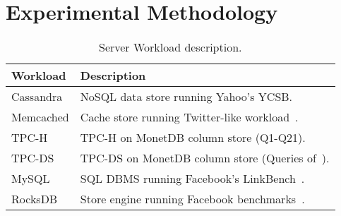 \section{Experimental Methodology}
\label{sec:methodology}

\begin{table}
        \begin{center}
                \caption{Server Workload description.}
                \scalebox{0.7}
                \small
                \vspace{0.01in}
                \label{table:workload}
                \renewcommand{\arraystretch}{1.0}
                {\scriptsize
                        \begin{tabular}{ l  l }
                                \toprule
                                {\bf Workload}                  & {\bf Description}  \\
                                \toprule
                                \multirow{1}{*}{Cassandra}      &  NoSQL data store running Yahoo's YCSB. \\
                                \cmidrule{2-2}
                                \multirow{1}{*}{Memcached}      & Cache store running Twitter-like workload~\cite{lim:thin}. \\
                                \cmidrule{2-2}
                                \multirow{1}{*}{TPC-H}          & TPC-H on MonetDB column store (Q1-Q21). \\
                                \cmidrule{2-2}
                                \multirow{1}{*}{TPC-DS}         & TPC-DS on MonetDB column store (Queries of~\cite{kocberber:meet}). \\
                                \cmidrule{2-2}
                                \multirow{1}{*}{MySQL}          & SQL DBMS running Facebook's LinkBench~\cite{facebook:linkbench}. \\
                                \cmidrule{2-2}
                                \multirow{1}{*}{RocksDB}        &  Store engine running Facebook benchmarks~\cite{facebook:rocksdb}. \\ %

                                \bottomrule
                        \end{tabular}
                } %
        \end{center}
        \vspace{-0.1in}
\end{table}

